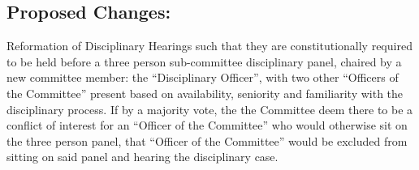 \documentclass[10pt, a4paper]{article}
\begin{document}
\subsection{Proposed Changes:}
Reformation of Disciplinary Hearings such that they are constitutionally required to be held before a three person sub-committee disciplinary panel, chaired by a new committee member: the ``Disciplinary Officer'', with two other ``Officers of the Committee'' present based on availability, seniority and familiarity with the disciplinary process. If by a majority vote, the the Committee deem there to be a conflict of interest for an ``Officer of the Committee'' who would otherwise sit on the three person panel, that ``Officer of the Committee'' would be excluded from sitting on said panel and hearing the disciplinary case.
\end{document}
